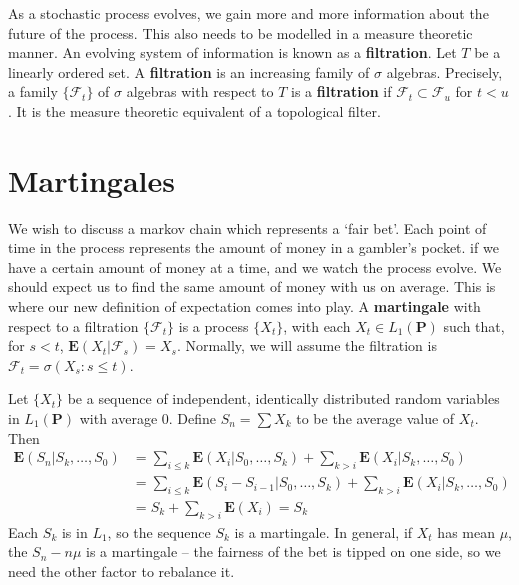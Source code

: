 As a stochastic process evolves, we gain more and more information about the future of the process. This also needs to be modelled in a measure theoretic manner. An evolving system of information is known as a {\bf filtration}. Let $T$ be a linearly ordered set. A {\bf filtration} is an increasing family of $\sigma$ algebras. Precisely, a family $\{ \mathcal{F}_t \}$ of $\sigma$ algebras with respect to $T$ is a {\bf filtration} if $\mathcal{F}_t \subset \mathcal{F}_u$ for $t < u$. It is the measure theoretic equivalent of a topological filter.

\section{Martingales}

We wish to discuss a markov chain which represents a `fair bet'. Each point of time in the process represents the amount of   money in a gambler's pocket. if we have a certain amount of money at a time, and we watch the process evolve. We should expect us to find the same amount of money with us on average. This is where our new definition of expectation comes into play. A {\bf martingale} with respect to a filtration $\{ \mathcal{F}_t \}$ is a process $\{X_t\}$, with each $X_t \in L_1(\mathbf{P})$ such that, for $s < t$, $\mathbf{E}(X_t | \mathcal{F}_s) = X_s$. Normally, we will assume the filtration is $\mathcal{F}_t = \sigma(X_s : s \leq t)$.

\begin{example}
    Let $\{ X_t \}$ be a sequence of independent, identically distributed random variables in $L_1(\mathbf{P})$ with average 0. Define $S_n = \sum X_k$ to be the average value of $X_t$. Then
    \begin{align*}
        \mathbf{E}(S_n | S_k, \dots, S_0) &= \sum_{i \leq k} \mathbf{E}(X_i | S_0, \dots, S_k) + \sum_{k > i} \mathbf{E}(X_i | S_k, \dots, S_0)\\
        &= \sum_{i \leq k} \mathbf{E}(S_{i} - S_{i-1} | S_0, \dots, S_k) + \sum_{k > i} \mathbf{E}(X_i | S_k, \dots, S_0)\\
        &= S_k + \sum_{k > i} \mathbf{E}(X_i) = S_k
    \end{align*}
    Each $S_k$ is in $L_1$, so the sequence $S_k$ is a martingale. In general, if $X_t$ has mean $\mu$, the $S_n - n \mu$ is a martingale -- the fairness of the bet is tipped on one side, so we need the other factor to rebalance it.
\end{example}

